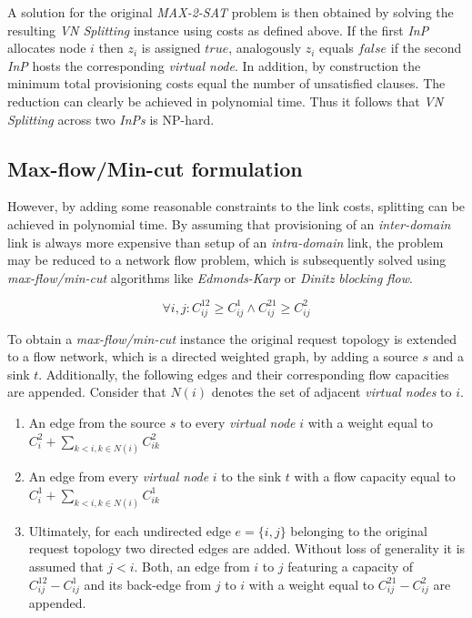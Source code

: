 \documentclass[prodmode,acmtomccap]{acmlarge}
\begin{document}
A solution for the original \emph{MAX-2-SAT} problem is then obtained by solving the resulting \emph{VN Splitting} instance using costs as defined above. If the first \emph{InP} allocates node $i$
then $z_i$ is assigned $true$, analogously $z_i$ equals $false$ if the second \emph{InP} hosts the corresponding \emph{virtual node}. In addition, by construction the minimum 
total provisioning costs equal the number of unsatisfied clauses.
The reduction can clearly be achieved in polynomial time. Thus it follows that \emph{VN Splitting} across two \emph{InPs} is NP-hard.

\subsection{Max-flow/Min-cut formulation}
However, by adding some reasonable constraints to the link costs, splitting can be achieved in polynomial time. By assuming that provisioning of an \emph{inter-domain} link is always more expensive
than setup of an \emph{intra-domain} link, the problem may be reduced to a network flow problem, which is subsequently solved using \emph{max-flow/min-cut} algorithms like \emph{Edmonds-Karp}
or \emph{Dinitz blocking flow}.

$$
	\forall i,j: C_{ij}^{12} \geq C_{ij}^1 \wedge C_{ij}^{21} \geq C_{ij}^2
$$

To obtain a \emph{max-flow/min-cut} instance the original request topology is extended to a flow network, which is a directed weighted graph, by adding a source $s$ and a sink $t$.
Additionally, the following edges and their corresponding flow capacities are appended. Consider that $N(i)$ denotes the set of adjacent \emph{virtual nodes} to $i$.

\begin{enumerate}
	\item An edge from the source $s$ to every \emph{virtual node} $i$ with a weight equal to $C_i^2 + \sum\limits_{k < i, k \in N(i)} C_{ik}^2$
	\item An edge from every \emph{virtual node} $i$ to the sink $t$ with a flow capacity equal to $C_i^1 + \sum\limits_{k < i, k \in N(i)} C_{ik}^1$
	\item Ultimately, for each undirected edge $e=\{i,j\}$ belonging to the original request topology two directed edges are added. Without loss of generality it is assumed that $j < i$.
		Both, an edge from $i$ to $j$ featuring a capacity of $C_{ij}^{12} - C_{ij}^1$ and its back-edge from $j$ to $i$ with a weight equal to $C_{ij}^{21} - C_{ij}^2$ are appended.
\end{enumerate}
\end{document}

